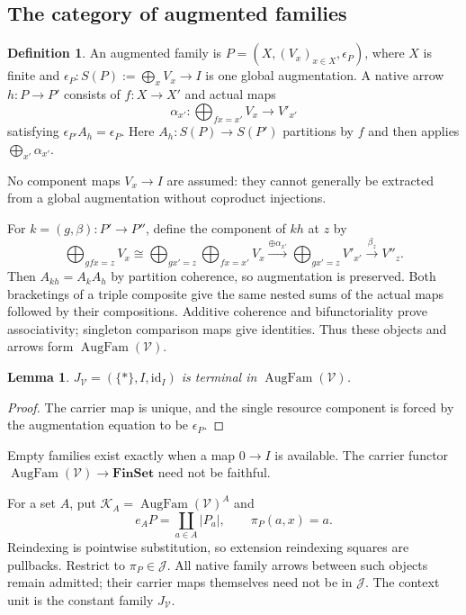 \documentclass[11pt,a4paper]{article}
\newtheorem{lemma}[theorem]{Lemma}
\theoremstyle{definition}
\newtheorem{definition}[theorem]{Definition}
\newcommand{\V}{\mathcal V}
\newcommand{\K}{\mathcal K}
\newcommand{\J}{\mathcal J}
\newcommand{\Aug}{\operatorname{AugFam}}
\newcommand{\id}{\mathrm{id}}
\newcommand{\FinSet}{\mathbf{FinSet}}
\begin{document}
\subsection{The category of augmented families}
\begin{definition}
An augmented family is $P=(X,(V_x)_{x\in X},\epsilon_P)$, where $X$ is finite
and $\epsilon_P:S(P):=\bigoplus_xV_x\to I$ is one global augmentation.
A native arrow $h:P\to P'$ consists of $f:X\to X'$ and actual maps
\[
 \alpha_{x'}:\bigoplus_{fx=x'}V_x\longrightarrow V'_{x'}
\]
satisfying $\epsilon_{P'}A_h=\epsilon_P$. Here $A_h:S(P)\to S(P')$
partitions by $f$ and then applies $\bigoplus_{x'}\alpha_{x'}$.
\end{definition}
No component maps $V_x\to I$ are assumed: they cannot generally be extracted
from a global augmentation without coproduct injections.

For $k=(g,\beta):P'\to P''$, define the component of $kh$ at $z$ by
\[
 \bigoplus_{gfx=z}V_x
 \cong\bigoplus_{gx'=z}\bigoplus_{fx=x'}V_x
 \xrightarrow{\oplus\alpha_{x'}}\bigoplus_{gx'=z}V'_{x'}
 \xrightarrow{\beta_z}V''_z.
\]
Then $A_{kh}=A_kA_h$ by partition coherence, so augmentation is preserved.
Both bracketings of a triple composite give the same nested sums of the
actual maps followed by their compositions. Additive coherence and
bifunctoriality prove associativity; singleton comparison maps give identities.
Thus these objects and arrows form $\Aug(\V)$.

\begin{lemma}\label{lem:terminal}
$J_\V=(\{*\},I,\id_I)$ is terminal in $\Aug(\V)$.
\end{lemma}
\begin{proof}
The carrier map is unique, and the single resource component is forced by
the augmentation equation to be $\epsilon_P$.
\end{proof}
Empty families exist exactly when a map $0\to I$ is available. The carrier
functor $\Aug(\V)\to\FinSet$ need not be faithful.

For a set $A$, put $\K_A=\Aug(\V)^A$ and
\[
 e_AP=\coprod_{a\in A}|P_a|,\qquad \pi_P(a,x)=a.
\]
Reindexing is pointwise substitution, so extension reindexing squares are
pullbacks. Restrict to $\pi_P\in\J$. All native family arrows between such
objects remain admitted; their carrier maps themselves need not be in $\J$.
The context unit is the constant family $J_\V$.
\end{document}
